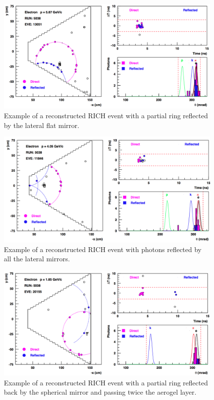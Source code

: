 \documentclass[5p,times,twocolumn]{elsarticle}
\begin{document}
\begin{figure}[t]
\begin{center}
\includegraphics[width=0.9\columnwidth]{Event_13051.png}
\end{center}
\caption{Example of a reconstructed RICH event with a partial ring reflected by the lateral flat mirror.}
\label{Fig:Event2}
\end{figure}

\begin{figure}[t]
\begin{center}
\includegraphics[width=0.9\columnwidth]{Event_11846.png}
\end{center}
\caption{Example of a reconstructed RICH event with photons reflected by all the lateral mirrors.} 
\label{Fig:Event3}
\end{figure}

\begin{figure}[t]
\begin{center}
\includegraphics[width=0.9\columnwidth]{Event_20155.png}
\end{center}
\caption{Example of a reconstructed RICH event with a partial ring reflected back by the spherical mirror and
  passing twice the aerogel layer.}
\label{Fig:Event4}
\end{figure}
\end{document}
